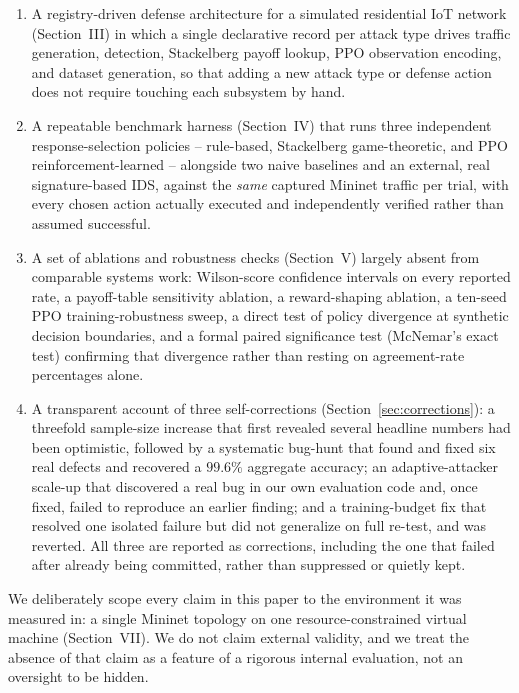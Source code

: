 \documentclass[conference]{IEEEtran}
\begin{document}
\begin{enumerate}
\item A registry-driven defense architecture for a simulated residential IoT network (Section~III)
  in which a single declarative record per attack type drives traffic generation, detection,
  Stackelberg payoff lookup, PPO observation encoding, and dataset generation, so that adding a
  new attack type or defense action does not require touching each subsystem by hand.
\item A repeatable benchmark harness (Section~IV) that runs three independent response-selection
  policies -- rule-based, Stackelberg game-theoretic, and PPO reinforcement-learned -- alongside
  two naive baselines and an external, real signature-based IDS, against the \emph{same} captured
  Mininet traffic per trial, with every chosen action actually executed and independently verified
  rather than assumed successful.
\item A set of ablations and robustness checks (Section~V) largely absent from comparable systems
  work: Wilson-score confidence intervals on every reported rate, a payoff-table sensitivity
  ablation, a reward-shaping ablation, a ten-seed PPO training-robustness sweep, a direct test of
  policy divergence at synthetic decision boundaries, and a formal paired significance test
  (McNemar's exact test) confirming that divergence rather than resting on agreement-rate
  percentages alone.
\item A transparent account of three self-corrections (Section~\ref{sec:corrections}): a threefold
  sample-size increase that first revealed several headline numbers had been optimistic, followed
  by a systematic bug-hunt that found and fixed six real defects and recovered a $99.6\%$ aggregate
  accuracy; an adaptive-attacker scale-up that discovered a real bug in our own evaluation code and,
  once fixed, failed to reproduce an earlier finding; and a training-budget fix that resolved one
  isolated failure but did not generalize on full re-test, and was reverted. All three are reported
  as corrections, including the one that failed after already being committed, rather than
  suppressed or quietly kept.
\end{enumerate}

We deliberately scope every claim in this paper to the environment it was measured in: a single
Mininet topology on one resource-constrained virtual machine (Section~VII). We do not claim
external validity, and we treat the absence of that claim as a feature of a rigorous internal
evaluation, not an oversight to be hidden.
\end{document}
